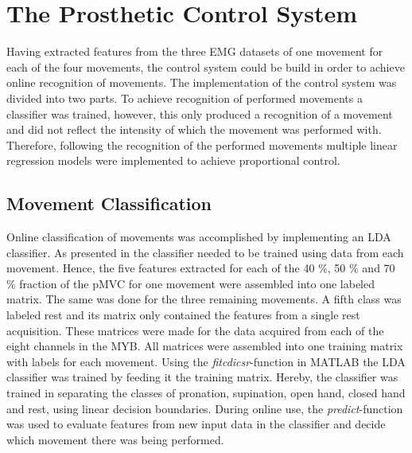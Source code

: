 
\section{The Prosthetic Control System}

Having extracted features from the three EMG datasets of one movement for each of the four movements, the control system could be build in order to achieve online recognition of movements. The implementation of the control system was divided into two parts. To achieve recognition of performed movements a classifier was trained, however, this only produced a recognition of a movement and did not reflect the intensity of which the movement was performed with. Therefore, following the recognition of the performed movements multiple linear regression models were implemented to achieve proportional control. 

\subsection{Movement Classification}

Online classification of movements was accomplished by implementing an LDA classifier. As presented in  the classifier needed to be trained using data from each movement. Hence, the five features extracted for each of the 40 $\percent$, 50 $\percent$ and 70 $\percent$ fraction of the pMVC for one movement were assembled into one labeled matrix. The same was done for the three remaining movements. A fifth class was labeled rest and its matrix only contained the features from a single rest acquisition. These matrices were made for the data acquired from each of the eight channels in the MYB. All matrices were assembled into one training matrix with labels for each movement. Using the \textit{fitcdicsr}-function in MATLAB the LDA classifier was trained by feeding it the training matrix. Hereby, the classifier was trained in separating the classes of pronation, supination, open hand, closed hand and rest, using linear decision boundaries. During online use, the \textit{predict}-function was used to evaluate features from new input data in the classifier and decide which movement there was being performed.    


